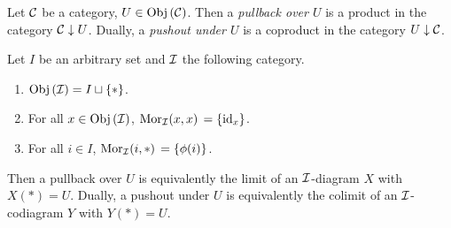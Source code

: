 \begin{dfn}
  
  Let $\mathcal{C}$ be a category, $U \in \mathrm{Obj}\left(\mathcal{C}\right)$.
  Then a \emph{pullback over $U$} is a product in the 
  category $\mathcal{C}\downarrow U$.
  Dually, a \emph{pushout under $U$} is a coproduct in the 
  category $U\downarrow \mathcal{C}$.

  Let $I$ be an arbitrary set and $\mathcal{I}$ the following category. 
  \begin{figure}[H]
    \centering
  \end{figure}
  \begin{enumerate}
    \item $\mathrm{Obj}\left(\mathcal{I}\right) = I \sqcup \left\{*\right\}$.
    \item For all $x \in \mathrm{Obj}\left(\mathcal{I}\right)$, $\mathrm{Mor}_{\mathcal{I}}(x, x)\, = \left\{\mathrm{id}_{x}\right\}$.
    \item For all $i \in I$, $\mathrm{Mor}_{\mathcal{I}}(i, *)\, = \left\{\phi(i)\right\}$.
  \end{enumerate}
  Then a pullback over $U$ is equivalently the limit of 
  an $\mathcal{I}$-diagram $X$ with $X(*) = U$. 
  Dually, a pushout under $U$ is equivalently the colimit of 
  an $\mathcal{I}$-codiagram $Y$ with $Y(*) = U$.
\end{dfn}